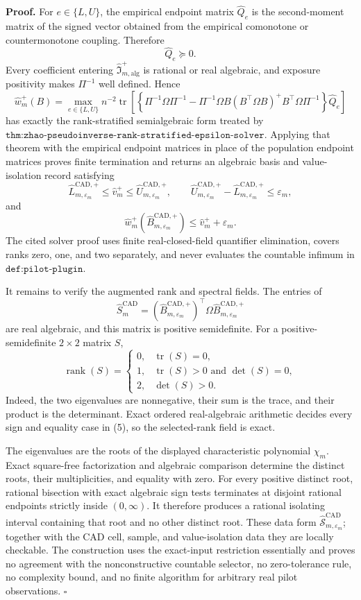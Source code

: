 \textbf{Proof.}
For \(e\in\{L,U\}\), the empirical endpoint matrix \(\widehat Q_e\) is the second-moment matrix of the signed vector obtained from the empirical comonotone or countermonotone coupling.  Therefore
\[
\widehat Q_e\succeq0.
\tag{1}
\]
Every coefficient entering \(\widehat{\mathfrak I}_{m,\mathrm{alg}}^+\) is rational or real algebraic, and exposure positivity makes \(\Pi^{-1}\) well defined.  Hence
\[
\widehat w_m^+(B)=
\max_{e\in\{L,U\}}n^{-2}\operatorname{tr}\!\left[
\left\{\Pi^{-1}\Omega\Pi^{-1}
-\Pi^{-1}\Omega B(B^{\top}\Omega B)^+B^{\top}\Omega\Pi^{-1}\right\}
\widehat Q_e\right]
\tag{2}
\]
has exactly the rank-stratified semialgebraic form treated by \(\texttt{thm:zhao-pseudoinverse-rank-stratified-epsilon-solver}\).  Applying that theorem with the empirical endpoint matrices in place of the population endpoint matrices proves finite termination and returns an algebraic basis and value-isolation record satisfying
\[
\widehat L_{m,\varepsilon_m}^{\mathrm{CAD},+}
\le\widehat v_m^+
\le\widehat U_{m,\varepsilon_m}^{\mathrm{CAD},+},
\qquad
\widehat U_{m,\varepsilon_m}^{\mathrm{CAD},+}
-\widehat L_{m,\varepsilon_m}^{\mathrm{CAD},+}
\le\varepsilon_m,
\tag{3}
\]
and
\[
\widehat w_m^+(\widehat B_{m,\varepsilon_m}^{\mathrm{CAD},+})
\le\widehat v_m^++\varepsilon_m.
\tag{4}
\]
The cited solver proof uses finite real-closed-field quantifier elimination, covers ranks zero, one, and two separately, and never evaluates the countable infimum in \(\texttt{def:pilot-plugin}\).

It remains to verify the augmented rank and spectral fields.  The entries of
\[
\widehat S_m^{\mathrm{CAD}}
=(\widehat B_{m,\varepsilon_m}^{\mathrm{CAD},+})^{\top}
\Omega\widehat B_{m,\varepsilon_m}^{\mathrm{CAD},+}
\]
are real algebraic, and this matrix is positive semidefinite.  For a positive-semidefinite \(2\times2\) matrix \(S\),
\[
\operatorname{rank}(S)=
\begin{cases}
0,&\operatorname{tr}(S)=0,\\
1,&\operatorname{tr}(S)>0\text{ and }\det(S)=0,\\
2,&\det(S)>0.
\end{cases}
\tag{5}
\]
Indeed, the two eigenvalues are nonnegative, their sum is the trace, and their product is the determinant.  Exact ordered real-algebraic arithmetic decides every sign and equality case in (5), so the selected-rank field is exact.

The eigenvalues are the roots of the displayed characteristic polynomial \(\chi_m\).  Exact square-free factorization and algebraic comparison determine the distinct roots, their multiplicities, and equality with zero.  For every positive distinct root, rational bisection with exact algebraic sign tests terminates at disjoint rational endpoints strictly inside \((0,\infty)\).  It therefore produces a rational isolating interval containing that root and no other distinct root.  These data form \(\widehat{\mathscr S}_{m,\varepsilon_m}^{\mathrm{CAD}}\); together with the CAD cell, sample, and value-isolation data they are locally checkable.  The construction uses the exact-input restriction essentially and proves no agreement with the nonconstructive countable selector, no zero-tolerance rule, no complexity bound, and no finite algorithm for arbitrary real pilot observations. \(\square\)
